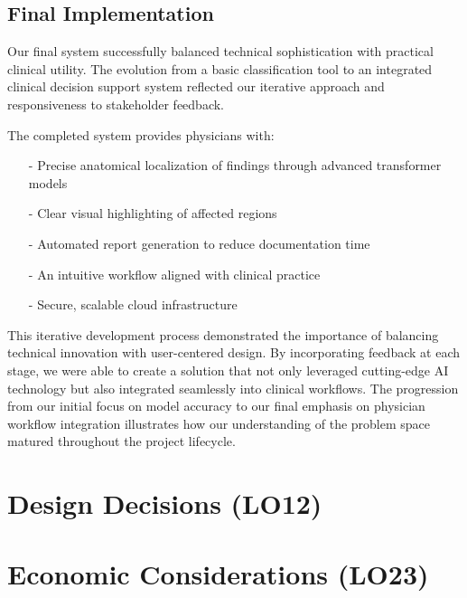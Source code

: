 \documentclass{article}
\begin{document}
\subsection{Final Implementation}

Our final system successfully balanced technical sophistication with practical clinical utility. The evolution from a basic classification tool to an integrated clinical decision support system reflected our iterative approach and responsiveness to stakeholder feedback. 

The completed system provides physicians with:
\begin{itemize}
    \item[-] Precise anatomical localization of findings through advanced transformer models
    \item[-] Clear visual highlighting of affected regions 
    \item[-] Automated report generation to reduce documentation time
    \item[-] An intuitive workflow aligned with clinical practice
    \item[-] Secure, scalable cloud infrastructure
\end{itemize}

This iterative development process demonstrated the importance of balancing technical innovation with user-centered design. By incorporating feedback at each stage, we were able to create a solution that not only leveraged cutting-edge AI technology but also integrated seamlessly into clinical workflows. The progression from our initial focus on model accuracy to our final emphasis on physician workflow integration illustrates how our understanding of the problem space matured throughout the project lifecycle.

\section{Design Decisions (LO12)}


\section{Economic Considerations (LO23)}

\end{document}
